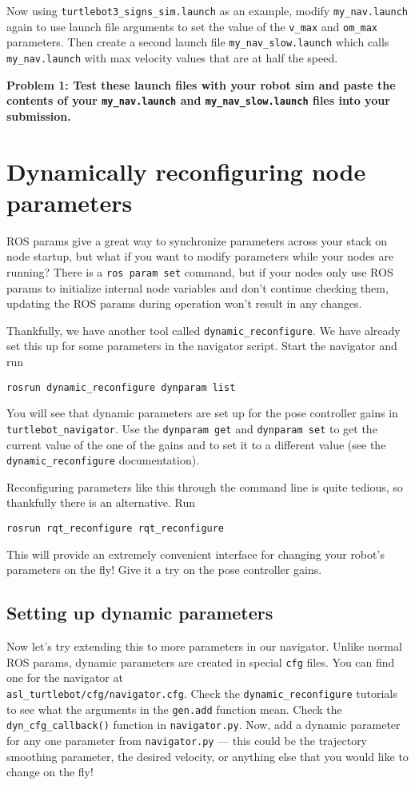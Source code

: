 \documentclass{article}
\begin{document}
Now using \texttt{turtlebot3\_signs\_sim.launch} as an example, modify \texttt{my\_nav.launch} again to use launch file arguments to set the value of the \texttt{v\_max} and \texttt{om\_max} parameters. Then create a second launch file \texttt{my\_nav\_slow.launch} which calls \texttt{my\_nav.launch} with max velocity values that are at half the speed.

{\bf Problem 1: Test these launch files with your robot sim and paste the contents of your \texttt{my\_nav.launch} and \texttt{my\_nav\_slow.launch} files into your submission.}

\section{Dynamically reconfiguring node parameters}
ROS params give a great way to synchronize parameters across your stack on node startup, but what if you want to modify parameters while your nodes are running? There is a \texttt{ros param set} command, but if your nodes only use ROS params to initialize internal node variables and don't continue checking them, updating the ROS params during operation won't result in any changes.

Thankfully, we have another tool called \texttt{dynamic\_reconfigure}. We have already set this up for some parameters in the navigator script. Start the navigator and run
\begin{lstlisting}
rosrun dynamic_reconfigure dynparam list
\end{lstlisting}

You will see that dynamic parameters are set up for the pose controller gains in \texttt{turtlebot\_navigator}. Use the \texttt{dynparam get} and \texttt{dynparam set} to get the current value of the one of the gains and to set it to a different value (see the \texttt{dynamic\_reconfigure} documentation).

Reconfiguring parameters like this through the command line is quite tedious, so thankfully there is an alternative. Run
\begin{lstlisting}
rosrun rqt_reconfigure rqt_reconfigure
\end{lstlisting}

This will provide an extremely convenient interface for changing your robot's parameters on the fly! Give it a try on the pose controller gains.

\subsection{Setting up dynamic parameters}
Now let's try extending this to more parameters in our navigator. Unlike normal ROS params, dynamic parameters are created in special \texttt{cfg} files. You can find one for the navigator at \\ \texttt{asl\_turtlebot/cfg/navigator.cfg}. Check the \texttt{dynamic\_reconfigure} tutorials to see what the arguments in the \texttt{gen.add} function mean. Check the \texttt{dyn\_cfg\_callback()} function in \texttt{navigator.py}. Now, add a dynamic parameter for any one parameter from \texttt{navigator.py} --- this could be the trajectory smoothing parameter, the desired velocity, or anything else that you would like to change on the fly! 
\end{document}
